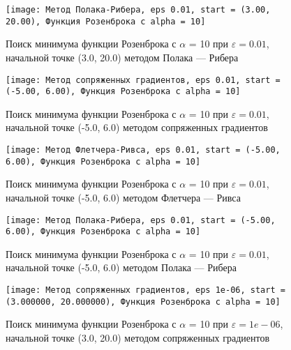             \begin{figure}[H]
	        \centering
	        \texttt{[image: Метод Полака-Рибера, eps 0.01, start = (3.00, 20.00), Функция Розенброка с alpha = 10]}%
	        \caption{Поиск минимума функции Розенброка с $\alpha$ = 10 при $\varepsilon = 0.01$, начальной точке (3.0, 20.0) методом Полака --- Рибера}
	        \vspace*{-1.2cm}
            \end{figure}
            
            \begin{figure}[H]
	        \centering
	        \texttt{[image: Метод сопряженных градиентов, eps 0.01, start = (-5.00, 6.00), Функция Розенброка с alpha = 10]}%
	        \caption{Поиск минимума функции Розенброка с $\alpha$ = 10 при $\varepsilon = 0.01$, начальной точке (-5.0, 6.0) методом сопряженных градиентов}
	        \vspace*{-1.2cm}
            \end{figure}
            
            \begin{figure}[H]
	        \centering
	        \texttt{[image: Метод Флетчера-Ривса, eps 0.01, start = (-5.00, 6.00), Функция Розенброка с alpha = 10]}%
	        \caption{Поиск минимума функции Розенброка с $\alpha$ = 10 при $\varepsilon = 0.01$, начальной точке (-5.0, 6.0) методом Флетчера --- Ривса}
	        \vspace*{-1.2cm}
            \end{figure}
            
            \begin{figure}[H]
	        \centering
	        \texttt{[image: Метод Полака-Рибера, eps 0.01, start = (-5.00, 6.00), Функция Розенброка с alpha = 10]}%
	        \caption{Поиск минимума функции Розенброка с $\alpha$ = 10 при $\varepsilon = 0.01$, начальной точке (-5.0, 6.0) методом Полака --- Рибера}
	        \vspace*{-1.2cm}
            \end{figure}
            
            \begin{figure}[H]
	        \centering
	        \texttt{[image: Метод сопряженных градиентов, eps 1e-06, start = (3.000000, 20.000000), Функция Розенброка с alpha = 10]}%
	        \caption{Поиск минимума функции Розенброка с $\alpha$ = 10 при $\varepsilon = 1e-06$, начальной точке (3.0, 20.0) методом сопряженных градиентов}
	        \vspace*{-1.2cm}
            \end{figure}
            
